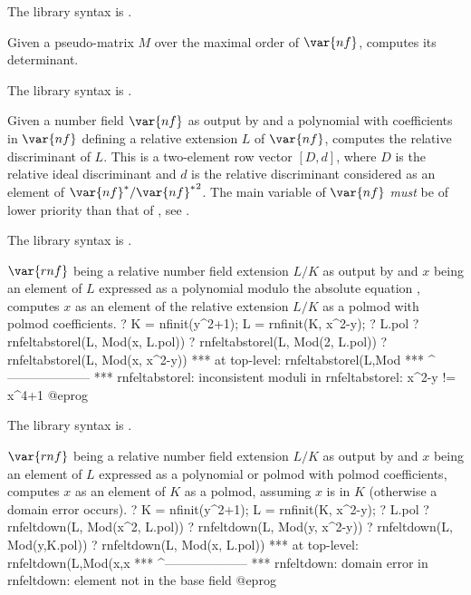 The library syntax is .

\label{se:rnfdet}
Given a pseudo-matrix $M$ over the maximal
order of $\var{nf}$, computes its determinant.

The library syntax is .

\label{se:rnfdisc}
Given a number field $\var{nf}$ as
output by  and a polynomial  with coefficients in
$\var{nf}$ defining a relative extension $L$ of $\var{nf}$, computes the
relative discriminant of $L$. This is a two-element row vector $[D,d]$, where
$D$ is the relative ideal discriminant and $d$ is the relative discriminant
considered as an element of $\var{nf}^*/{\var{nf}^*}^2$. The main variable of
$\var{nf}$ \emph{must} be of lower priority than that of , see
.

The library syntax is .

\label{se:rnfeltabstorel}
$\var{rnf}$ being a relative
number field extension $L/K$ as output by  and $x$ being an
element of $L$ expressed as a polynomial modulo the absolute equation
, computes $x$ as an element of the relative extension
$L/K$ as a polmod with polmod coefficients.
\bprog
? K = nfinit(y^2+1); L = rnfinit(K, x^2-y);
? L.pol
? rnfeltabstorel(L, Mod(x, L.pol))
? rnfeltabstorel(L, Mod(2, L.pol))
? rnfeltabstorel(L, Mod(x, x^2-y))
 ***   at top-level: rnfeltabstorel(L,Mod
 ***                 ^--------------------
 *** rnfeltabstorel: inconsistent moduli in rnfeltabstorel: x^2-y != x^4+1
@eprog

The library syntax is .

\label{se:rnfeltdown}
$\var{rnf}$ being a relative number
field extension $L/K$ as output by  and $x$ being an element of
$L$ expressed as a polynomial or polmod with polmod coefficients, computes
$x$ as an element of $K$ as a polmod, assuming $x$ is in $K$ (otherwise a
domain error occurs).
\bprog
? K = nfinit(y^2+1); L = rnfinit(K, x^2-y);
? L.pol
? rnfeltdown(L, Mod(x^2, L.pol))
? rnfeltdown(L, Mod(y, x^2-y))
? rnfeltdown(L, Mod(y,K.pol))
? rnfeltdown(L, Mod(x, L.pol))
 ***   at top-level: rnfeltdown(L,Mod(x,x
 ***                 ^--------------------
 *** rnfeltdown: domain error in rnfeltdown: element not in the base field
@eprog

